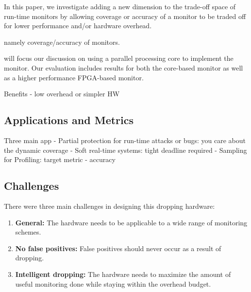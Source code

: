 In this paper, we investigate adding a new dimension to the trade-off space of 
run-time monitors by allowing coverage or accuracy of a monitor to be traded
off for lower performance and/or hardware overhead.

namely coverage/accuracy of monitors.


will focus our discussion on using a parallel
processing core to implement the monitor. Our evaluation includes results
for both the core-based monitor as well as a higher performance FPGA-based monitor.

Benefits - low overhead or simpler HW

\subsection{Applications and Metrics}

Three main app
- Partial protection for run-time attacks or bugs: you care about the dynamic coverage 
- Soft real-time systems: tight deadline required
- Sampling for Profiling: target metric - accuracy

\subsection{Challenges}

There were three main challenges in designing this dropping hardware:
\begin{enumerate}
  \item \textbf{General:} The hardware needs to be applicable to a wide range of monitoring schemes.
  \item \textbf{No false positives:} False positives should never occur as a result of dropping.
  \item \textbf{Intelligent dropping:} The hardware needs to maximize the amount of useful monitoring done while staying within the overhead budget.
\end{enumerate}



